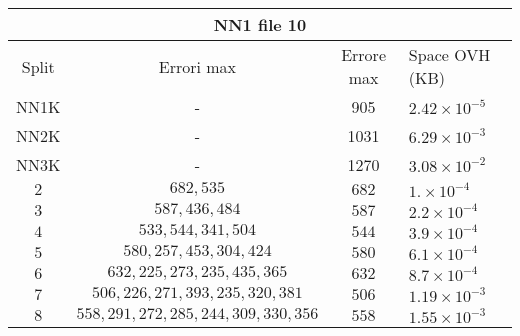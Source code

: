 \documentclass[]{article}
\begin{document}
	\begin{center}
		\begin{tabular}{|c | c | c | l |}
			\hline
			\multicolumn{4}{c}{NN1 file 10} \\
			\hline
			Split & Errori max & Errore max & Space OVH (KB) \\ \hline
			NN1K & - & 905 & $2.42 \times 10^{-5}$  \\ 
			NN2K & - & 1031 & $6.29 \times 10^{-3}$\\
			NN3K & - & 1270  & $3.08 \times 10^{-2}$ \\
			$2$ & $682, 535$ & $682$ & $1.\times 10^{-4}$ \\ 
			$3$ & $587, 436, 484$ & $587$ & $2.2\times 10^{-4}$ \\ 
			$4$ & $533, 544, 341, 504$ & $544$ & $3.9\times 10^{-4}$ \\ 
			$5$ & $580, 257, 453, 304, 424$ & $580$ & $6.1\times 10^{-4}$ \\ 
			$6$ & $632, 225, 273, 235, 435, 365$ & $632$ & $8.7\times 10^{-4}$ \\ 
			$7$ & $506, 226, 271, 393, 235, 320, 381$ & $506$ & $1.19\times 10^{-3}$ \\ 
			$8$ & $558, 291, 272, 285, 244, 309, 330, 356$ & $558$ & $1.55\times 10^{-3}$ \\
			\hline  
		\end{tabular}
	\end{center}
\end{document}
